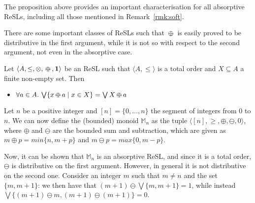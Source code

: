 \documentclass{llncs}
\newcommand{\shortNoProof}[1]{ }
\def\monid{{\mathbf 0}}
\def\monop{\otimes}
\def\odiv{\, {\ominus\hspace{-7.7pt} \div} \,}
\def\monid{\mathbf{1}}
\begin{document}
\begin{remark}\label{rmk:softUnit}
The proposition above provides an important characterisation for all absorptive ReSLs, including all those mentioned in Remark~\ref{rmk:soft}.
\end{remark}

There are some important classes of ReSLs  such that $\odiv$ is easily proved to be distributive in the first argument,
while it is not so with respect to the second argument, not even in the absorptive case.

\begin{lemma}
	\label{distodiv2}
	Let $\langle A, \leq, \monop, \odiv, \monid \rangle$ be an ReSL such that $\langle A, \leq \rangle$ is a total order and $X \subseteq A$ a finite non-empty set. Then 
	\begin{itemize}
		\item $\forall a \in A.\, \bigvee \{ x \odiv a \mid x \in X \} = \bigvee X \odiv a$
	\end{itemize}	
\end{lemma}

\shortNoProof{
\begin{proof}
If $\langle A, \leq \rangle$ is a total order and $X$ is finite and non-empty we have that $\bigvee X \in X$, and since $\odiv$ 
is monotone on the first argument (see Lemma~\ref{mono}) the result follows.
\qed
\end{proof}
}

\begin{example}
\label{nodist2}
%
Let $n$ be a positive integer and $[n] = \{0, \ldots, n\}$ the segment of integers from $0$ to $n$. We can now define the (bounded) monoid $\mathbb{M}_n$ 
as the tuple $\langle [n], \geq, \oplus, \ominus, 0 \rangle$, where $\oplus$ and $\ominus$ are the bounded sum and subtraction, 
which are given as $m\oplus p = min\{n, m+p\}$ and $m\ominus p = max\{0,m-p\}$.

Now, it can be shown that $\mathbb{M}_n$ is an absorptive ReSL, and since it is a total order,
$\ominus$ is  distributive on the first argument.
%
However, in general it is not distributive on the second one. Consider an integer $m$ such that 
$m \neq n$ and the set $\{m, m+1\}$:
we then have that $(m+1) \ominus \bigvee\{m, m+1\} = 1$,
while instead $\bigvee\{(m+1) \ominus m, (m+1) \ominus (m+1)\} = 0$.
\end{example}
\end{document}
